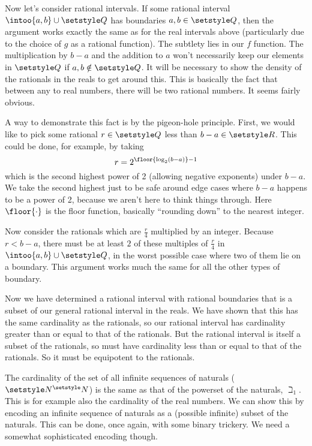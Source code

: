 Now let's consider rational intervals. If some rational interval
\(\intoo{a, b} \cup \Rationals\) has boundaries \(a, b \in \Rationals\), then
the argument works exactly the same as for the real intervals above
(particularly due to the choice of \(g\) as a rational function).
The subtlety lies in our \(f\) function. The multiplication by \(b - a\) and the
addition to \(a\) won't necessarily keep our elements in \(\Rationals\) if
\(a, b \notin \Rationals\). It will be necessary to show the density of the
rationals in the reals to get around this. This is basically the fact that
between any to real numbers, there will be two rational numbers. It seems fairly
obvious.

A way to demonstrate this fact is by the pigeon-hole principle. First, we would
like to pick some rational \(r \in \Rationals\) less than \(b - a \in \Reals\).
This could be done, for example, by taking
\begin{equation*}
 r = 2^{\floor{\log_2(b - a)} - 1}
\end{equation*}
which is the second highest power of 2 (allowing negative exponents) under
\(b - a\). We take the second highest just to be safe around edge cases where
\(b - a\) happens to be a power of 2, because we aren't here to think things
through. Here \(\floor{\cdot}\) is the floor function, basically ``rounding
down'' to the nearest integer.

Now consider the rationals which are \(\frac r4\) multiplied by an integer.
Because \(r < b - a\), there must be at least \(2\) of these multiples of
\(\frac r4\) in \(\intoo{a, b} \cup \Rationals\), in the worst possible case
where two of them lie on a boundary. This argument works much the same for all
the other types of boundary.

Now we have determined a rational interval with rational boundaries that is a
subset of our general rational interval in the reals. We have shown that this
has the same cardinality as the rationals, so our rational interval has
cardinality greater than or equal to that of the rationals. But the rational
interval is itself a subset of the rationals, so must have cardinality less than
or equal to that of the rationals. So it must be equipotent to the rationals.

The cardinality of the set of all infinite sequences of naturals
(\(\Naturals^\Naturals\)) is the same as that of the powerset of the naturals,
\(\beth_1\). This is for example also the cardinality of the real numbers. We
can show this by encoding an infinite sequence of naturals as a (possible
infinite) subset of the naturals. This can be done, once again, with some binary
trickery. We need a somewhat sophisticated encoding though.

